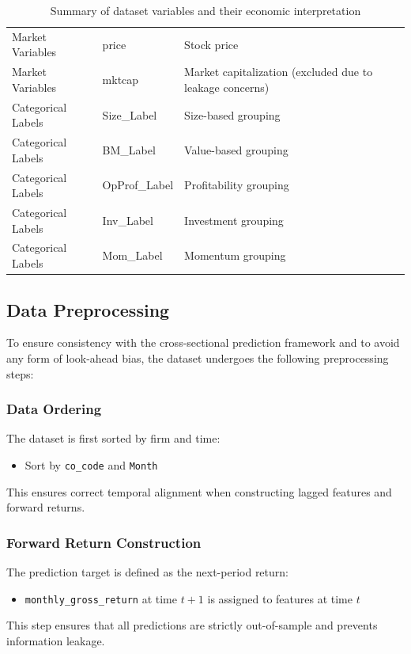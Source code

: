 \documentclass[11pt]{article}
\begin{document}
\begin{table}[H]
\begin{tabular}{|l|l|p{7cm}|}
\hline
Market Variables & price & Stock price \\
Market Variables & mktcap & Market capitalization (excluded due to leakage concerns) \\

\hline
Categorical Labels & Size\_Label & Size-based grouping \\
Categorical Labels & BM\_Label & Value-based grouping \\
Categorical Labels & OpProf\_Label & Profitability grouping \\
Categorical Labels & Inv\_Label & Investment grouping \\
Categorical Labels & Mom\_Label & Momentum grouping \\

\hline
\end{tabular}
\caption{Summary of dataset variables and their economic interpretation}
\end{table}

\subsection{Data Preprocessing}

To ensure consistency with the cross-sectional prediction framework and to avoid any form of look-ahead bias, the dataset undergoes the following preprocessing steps:

\subsubsection{Data Ordering}

The dataset is first sorted by firm and time:
\begin{itemize}
    \item Sort by \texttt{co\_code} and \texttt{Month}
\end{itemize}
This ensures correct temporal alignment when constructing lagged features and forward returns.

\subsubsection{Forward Return Construction}

The prediction target is defined as the next-period return:
\begin{itemize}
    \item \texttt{monthly\_gross\_return} at time $t+1$ is assigned to features at time $t$
\end{itemize}
This step ensures that all predictions are strictly out-of-sample and prevents information leakage.
\end{document}
